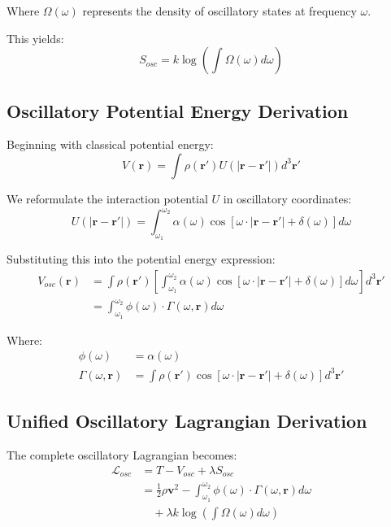 \documentclass[12pt,a4paper]{article}
\begin{document}
Where $\Omega(\omega)$ represents the density of oscillatory states at frequency $\omega$.

This yields:
\begin{equation}
S_{osc} = k \log \left(\int \Omega(\omega) d\omega\right)
\end{equation}

\subsection{Oscillatory Potential Energy Derivation}

Beginning with classical potential energy:
\begin{equation}
V(\mathbf{r}) = \int \rho(\mathbf{r}') U(|\mathbf{r} - \mathbf{r}'|) d^3\mathbf{r}'
\end{equation}

We reformulate the interaction potential $U$ in oscillatory coordinates:
\begin{equation}
U(|\mathbf{r} - \mathbf{r}'|) = \int_{\omega_1}^{\omega_2} \alpha(\omega) \cos[\omega \cdot |\mathbf{r} - \mathbf{r}'| + \delta(\omega)] d\omega
\end{equation}

Substituting this into the potential energy expression:
\begin{align}
V_{osc}(\mathbf{r}) &= \int \rho(\mathbf{r}') \left[\int_{\omega_1}^{\omega_2} \alpha(\omega) \cos[\omega \cdot |\mathbf{r} - \mathbf{r}'| + \delta(\omega)] d\omega\right] d^3\mathbf{r}' \\
&= \int_{\omega_1}^{\omega_2} \phi(\omega) \cdot \Gamma(\omega, \mathbf{r}) d\omega
\end{align}

Where:
\begin{align}
\phi(\omega) &= \alpha(\omega) \\
\Gamma(\omega, \mathbf{r}) &= \int \rho(\mathbf{r}') \cos[\omega \cdot |\mathbf{r} - \mathbf{r}'| + \delta(\omega)] d^3\mathbf{r}'
\end{align}

\subsection{Unified Oscillatory Lagrangian Derivation}

The complete oscillatory Lagrangian becomes:
\begin{align}
\mathcal{L}_{osc} &= T - V_{osc} + \lambda S_{osc} \\
&= \frac{1}{2}\rho \mathbf{v}^2 - \int_{\omega_1}^{\omega_2} \phi(\omega) \cdot \Gamma(\omega, \mathbf{r}) d\omega \\
&\quad + \lambda k \log \left(\int \Omega(\omega) d\omega\right)
\end{align}
\end{document}
